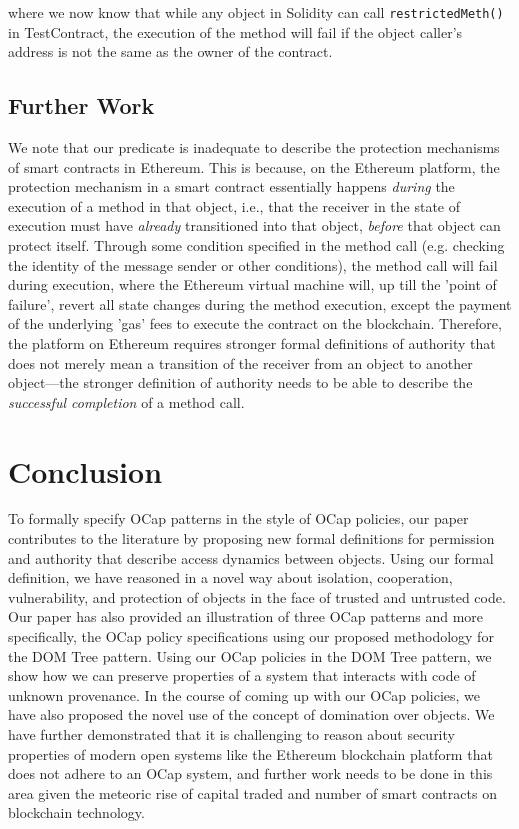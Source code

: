 \documentclass[a4paper,11pt,twoside]{article}
\begin{document}
{where we now know that while any object in Solidity can call \texttt{restrictedMeth()} in TestContract, the execution of the method will fail if the object caller's address is not the same as the owner of the contract.
\subsection{Further Work}
We note that our  predicate is inadequate to describe the protection mechanisms of smart contracts in Ethereum. This is because, on the Ethereum platform, the protection mechanism in a smart contract essentially happens \textit{during} the execution of a method in that object, i.e., that the receiver in the state of execution must have \textit{already} transitioned into that object, \textit{before} that object can protect itself. Through some condition specified in the method call (e.g. checking the identity of the message sender or other conditions), the method call will fail during execution, where the Ethereum virtual machine will, up till the 'point of failure', revert all state changes during the method execution, except the payment of the underlying 'gas' fees to execute the contract on the blockchain. Therefore, the platform on Ethereum requires stronger formal definitions of authority that does not merely mean a transition of the receiver from an object to another object---the stronger definition of authority needs to be able to describe the \textit{successful completion} of a method call.

\section{Conclusion}
To formally specify OCap patterns in the style of OCap policies, our paper contributes to the literature by proposing new formal definitions for permission and authority that describe access dynamics between objects. Using our formal definition, we have reasoned in a novel way about isolation, cooperation, vulnerability, and protection of objects in the face of trusted and untrusted code. Our paper has also provided an illustration of three OCap patterns and more specifically, the OCap policy specifications using our proposed methodology for the DOM Tree pattern.  Using our OCap policies in the DOM Tree pattern, we show how we can preserve properties of a system that interacts with code of unknown provenance. In the course of coming up with our OCap policies, we have also proposed the novel use of the concept of domination over objects. We have further demonstrated that it is challenging to reason about security properties of modern open systems like the Ethereum blockchain platform that does not adhere to an OCap system, and further work needs to be done in this area given the meteoric rise of capital traded and number of smart contracts on blockchain technology.

}
\end{document}
